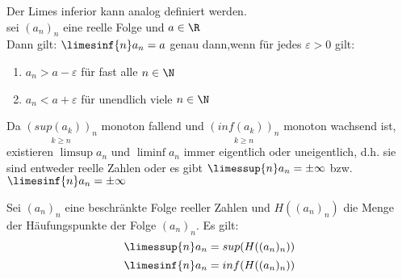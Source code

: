 \documentclass[12pt,a4paper,titlepage,draft]{article}
\begin{document}
	\begin{bem}
		Der Limes inferior kann analog definiert werden.\\
		sei \((a_n)_n\) eine reelle Folge und \(a \in \R\)\\
		Dann gilt: \(\limesinf{n} a_n = a\) genau dann,wenn für jedes \(\varepsilon > 0\) gilt:
		\begin{enumerate}
			\item \(a_n > a - \varepsilon\) für fast alle \(n \in \N\)
			\item \(a_n < a + \varepsilon\) für unendlich viele \(n \in \N\)
		\end{enumerate}
	\end{bem}
	\begin{bem}
		Da \(\underset{k \geq n}{(sup(a_k))_n}\) monoton fallend und \(\underset{k \geq n}{(inf(a_k))_n}\) monoton wachsend ist, existieren \(\limsup a_n \) und \(\liminf a_n\) immer eigentlich oder uneigentlich, d.h. sie sind entweder reelle Zahlen oder es gibt \(\limessup{n} a_n = \pm \infty \) bzw. \(\limesinf{n} a_n = \pm \infty \) 
	\end{bem}
	\begin{lem}
		Sei \((a_n)_n\) eine beschränkte Folge reeller Zahlen und \(H((a_n)_n)\) die Menge der Häufungspunkte der Folge \((a_n)_n\). Es gilt:\\
		\[\limessup{n} a_n = sup(H((a_n)_n))\]
		\[\limesinf{n} a_n = inf(H((a_n)_n))\]
	\end{lem}
\end{document}

